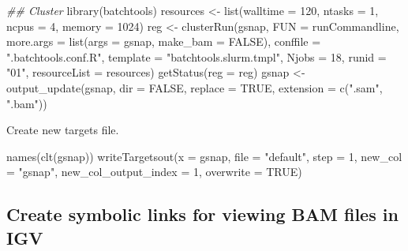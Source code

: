 \documentclass[14pt,]{article}
\newcommand{\hlnum}[1]{\textcolor[rgb]{0.816,0.125,0.439}{#1}}%
\newcommand{\hlstr}[1]{\textcolor[rgb]{0.251,0.627,0.251}{#1}}%
\newcommand{\hlcom}[1]{\textcolor[rgb]{0.502,0.502,0.502}{\textit{#1}}}%
\newcommand{\hlstd}[1]{\textcolor[rgb]{0.251,0.251,0.251}{#1}}%
\newenvironment{Shaded}{\begin{myshaded}}{\end{myshaded}}
\newcommand{\DecValTok}[1]{\hlnum{#1}}
\newcommand{\ConstantTok}[1]{\hlnum{#1}}
\newcommand{\StringTok}[1]{\hlstr{#1}}
\newcommand{\DocumentationTok}[1]{\hlcom{#1}}
\newcommand{\OtherTok}[1]{{#1}}
\newcommand{\FunctionTok}[1]{\hlstd{#1}}
\newcommand{\AttributeTok}[1]{{#1}}
\newcommand{\NormalTok}[1]{\hlstd{#1}}
\begin{document}
\begin{Shaded}
\begin{Highlighting}[]
\DocumentationTok{\#\# Cluster}
\FunctionTok{library}\NormalTok{(batchtools)}
\NormalTok{resources }\OtherTok{\textless{}{-}} \FunctionTok{list}\NormalTok{(}\AttributeTok{walltime =} \DecValTok{120}\NormalTok{, }\AttributeTok{ntasks =} \DecValTok{1}\NormalTok{, }\AttributeTok{ncpus =} \DecValTok{4}\NormalTok{, }\AttributeTok{memory =} \DecValTok{1024}\NormalTok{)}
\NormalTok{reg }\OtherTok{\textless{}{-}} \FunctionTok{clusterRun}\NormalTok{(gsnap, }\AttributeTok{FUN =}\NormalTok{ runCommandline, }\AttributeTok{more.args =} \FunctionTok{list}\NormalTok{(}\AttributeTok{args =}\NormalTok{ gsnap, }\AttributeTok{make\_bam =} \ConstantTok{FALSE}\NormalTok{), }
    \AttributeTok{conffile =} \StringTok{".batchtools.conf.R"}\NormalTok{, }\AttributeTok{template =} \StringTok{"batchtools.slurm.tmpl"}\NormalTok{, }\AttributeTok{Njobs =} \DecValTok{18}\NormalTok{, }
    \AttributeTok{runid =} \StringTok{"01"}\NormalTok{, }\AttributeTok{resourceList =}\NormalTok{ resources)}
\FunctionTok{getStatus}\NormalTok{(}\AttributeTok{reg =}\NormalTok{ reg)}
\NormalTok{gsnap }\OtherTok{\textless{}{-}} \FunctionTok{output\_update}\NormalTok{(gsnap, }\AttributeTok{dir =} \ConstantTok{FALSE}\NormalTok{, }\AttributeTok{replace =} \ConstantTok{TRUE}\NormalTok{, }\AttributeTok{extension =} \FunctionTok{c}\NormalTok{(}\StringTok{".sam"}\NormalTok{, }
    \StringTok{".bam"}\NormalTok{))}
\end{Highlighting}
\end{Shaded}

Create new targets file.

\begin{Shaded}
\begin{Highlighting}[]
\FunctionTok{names}\NormalTok{(}\FunctionTok{clt}\NormalTok{(gsnap))}
\FunctionTok{writeTargetsout}\NormalTok{(}\AttributeTok{x =}\NormalTok{ gsnap, }\AttributeTok{file =} \StringTok{"default"}\NormalTok{, }\AttributeTok{step =} \DecValTok{1}\NormalTok{, }\AttributeTok{new\_col =} \StringTok{"gsnap"}\NormalTok{, }\AttributeTok{new\_col\_output\_index =} \DecValTok{1}\NormalTok{, }
    \AttributeTok{overwrite =} \ConstantTok{TRUE}\NormalTok{)}
\end{Highlighting}
\end{Shaded}

\hypertarget{create-symbolic-links-for-viewing-bam-files-in-igv}{%
\subsection{Create symbolic links for viewing BAM files in IGV}\label{create-symbolic-links-for-viewing-bam-files-in-igv}}
\end{document}
